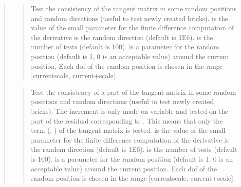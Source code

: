 \documentclass[a4paper,11pt,english]{sphinxmanual}
\begin{document}
\begin{quote}
\begin{quote}
\begin{itemize}
\end{itemize}
\end{quote}

\sphinxAtStartPar
{}
\begin{quote}

\sphinxAtStartPar
Test the consistency of the tangent matrix in some random positions
and random directions (useful to test newly created bricks).
 is the value of the small parameter for the finite difference
computation of the derivative is the random direction (default is 1E\sphinxhyphen{}6).
 is the number of tests (default is 100).  is a parameter
for the random position (default is 1, 0 is an acceptable value) around
the current position.
Each dof of the random position is chosen in the range
{[}current\sphinxhyphen{}scale, current+scale{]}.
\end{quote}

\sphinxAtStartPar
{}
\begin{quote}

\sphinxAtStartPar
Test the consistency of a part of the tangent matrix in some
random positions and random directions
(useful to test newly created bricks).
The increment is only made on variable  and tested on the
part of the residual corresponding to . This means that
only the term (, ) of the tangent matrix is tested.
 is the value of the small parameter for the finite difference
computation of the derivative is the random direction (default is 1E\sphinxhyphen{}6).
 is the number of tests (default is 100).  is a parameter
for the random position (default is 1, 0 is an acceptable value)
around the current position.
Each dof of the random position is chosen in the range
{[}current\sphinxhyphen{}scale, current+scale{]}.
\end{quote}

\sphinxAtStartPar
{}
\begin{quote}


\end{quote}
\end{quote}
\end{document}
